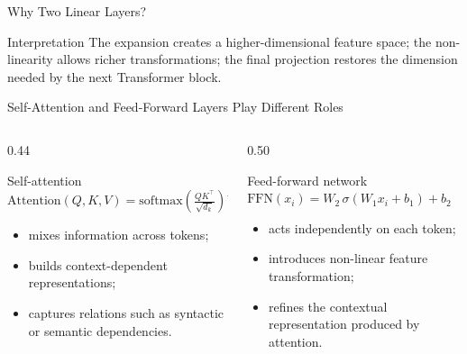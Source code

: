 \documentclass[aspectratio=169]{beamer}
\begin{document}
%
%
\begin{frame}{Why Two Linear Layers?}
  \begin{block}{Interpretation}
    The expansion creates a higher-dimensional feature space; the non-linearity allows
    richer transformations; the final projection restores the dimension needed by the
    next Transformer block.
  \end{block}
\end{frame}
%
%
\begin{frame}{Self-Attention and Feed-Forward Layers Play Different Roles}
  \begin{columns}[t]
    \begin{column}{0.44\textwidth}
      \begin{block}{Self-attention}
        \centering\vspace{0.3em}
        $\displaystyle\mathrm{Attention}(Q,K,V)
          = \mathrm{softmax}\!\!\left(\!\frac{QK^\top}{\sqrt{d_k}}\!\right)V$
        \vspace{0.3em}
        \begin{itemize}
          \item mixes information across tokens;
          \item builds context-dependent representations;
          \item captures relations such as syntactic or semantic dependencies.
        \end{itemize}
      \end{block}
    \end{column}
    \begin{column}{0.50\textwidth}
      \begin{block}{Feed-forward network}
        \centering\vspace{0.3em}
        $\mathrm{FFN}(x_i) = W_2\,\sigma(W_1 x_i + b_1) + b_2$
        \vspace{0.3em}
        \begin{itemize}
          \item acts independently on each token;
          \item introduces non-linear feature transformation;
          \item refines the contextual representation produced by attention.
        \end{itemize}
      \end{block}
    \end{column}
  \end{columns}
\end{frame}
\end{document}

